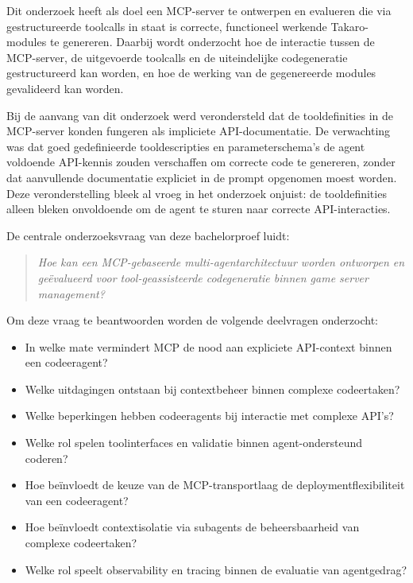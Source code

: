 Dit onderzoek heeft als doel een MCP-server te ontwerpen en evalueren die via gestructureerde toolcalls in staat is correcte, functioneel werkende Takaro-modules te genereren. Daarbij wordt onderzocht hoe de interactie tussen de MCP-server, de uitgevoerde toolcalls en de uiteindelijke codegeneratie gestructureerd kan worden, en hoe de werking van de gegenereerde modules gevalideerd kan worden.

Bij de aanvang van dit onderzoek werd verondersteld dat de tooldefinities in de MCP-server konden fungeren als impliciete API-documentatie. De verwachting was dat goed gedefinieerde tooldescripties en parameterschema's de agent voldoende API-kennis zouden verschaffen om correcte code te genereren, zonder dat aanvullende documentatie expliciet in de prompt opgenomen moest worden. Deze veronderstelling bleek al vroeg in het onderzoek onjuist: de tooldefinities alleen bleken onvoldoende om de agent te sturen naar correcte API-interacties.

De centrale onderzoeksvraag van deze bachelorproef luidt:

\begin{quote}
  \textit{Hoe kan een MCP-gebaseerde multi-agentarchitectuur worden ontworpen en geëvalueerd voor tool-geassisteerde codegeneratie binnen game server management?}
\end{quote}

Om deze vraag te beantwoorden worden de volgende deelvragen onderzocht:

\begin{itemize}
  \item In welke mate vermindert MCP de nood aan expliciete API-context binnen een codeeragent?
  \item Welke uitdagingen ontstaan bij contextbeheer binnen complexe codeertaken?
  \item Welke beperkingen hebben codeeragents bij interactie met complexe API's?
  \item Welke rol spelen toolinterfaces en validatie binnen agent-ondersteund coderen?
  \item Hoe beïnvloedt de keuze van de MCP-transportlaag de deploymentflexibiliteit van een codeeragent?
  \item Hoe beïnvloedt contextisolatie via subagents de beheersbaarheid van complexe codeertaken?
  \item Welke rol speelt observability en tracing binnen de evaluatie van agentgedrag?
\end{itemize}

